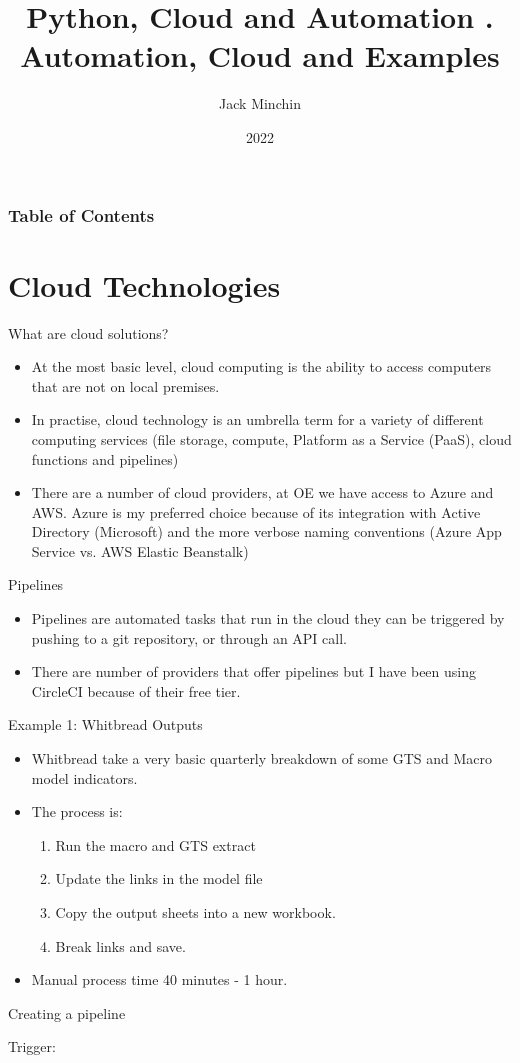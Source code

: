 \documentclass[aspectratio=169]{beamer}
\title{\large{\textbf{Python, Cloud and Automation}} \newline\newline 3. Automation, Cloud and Examples}
\author{Jack Minchin}
\institute{Tourism Economics}
\date{2022}
\begin{document}
\frame{\titlepage}

\begin{frame}
\frametitle{Table of Contents}
\tableofcontents
\end{frame}


\section{Cloud Technologies}

\begin{frame}{What are cloud solutions?}

\begin{itemize}
	\item At the most basic level, cloud computing is the ability to access computers that are not on local premises. 
	\item In practise, cloud technology is an umbrella term for a variety of different computing services (file storage, compute, Platform as a Service (PaaS), cloud functions and pipelines)
	\item There are a number of cloud providers, at OE we have access to Azure and AWS. Azure is my preferred choice because of its integration with Active Directory (Microsoft) and the more verbose naming conventions (Azure App Service vs. AWS Elastic Beanstalk)
\end{itemize}

\end{frame}

\begin{frame}{Pipelines}

\begin{itemize}
	\item Pipelines are automated tasks that run in the cloud they can be triggered by pushing to a git repository, or through an API call.
	\item There are number of providers that offer pipelines but I have been using CircleCI because of their free tier. 
\end{itemize}
\end{frame}

\begin{frame}{Example 1: Whitbread Outputs}

\begin{itemize}
	\item Whitbread take a very basic quarterly breakdown of some GTS and Macro model indicators.
	\item The process is:
	\begin{enumerate}
		\item Run the macro and GTS extract
		\item Update the links in the model file
		\item Copy the output sheets into a new workbook. 
		\item Break links and save.
	\end{enumerate}
	\item Manual process time 40 minutes - 1 hour.
\end{itemize}
\end{frame}

\begin{frame}{Creating a pipeline}

Trigger: 
	
\end{frame}


	
\end{document}
